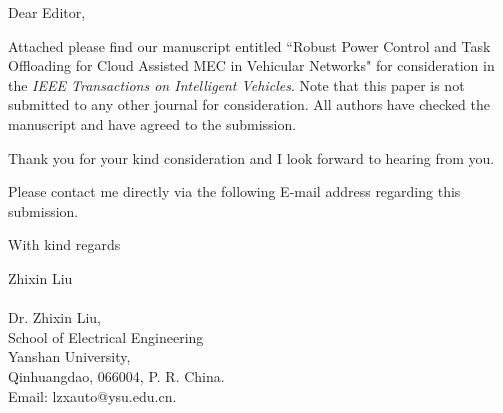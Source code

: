\documentclass[12pt]{letter}
\begin{document}
Dear Editor,

Attached please find our manuscript entitled ``Robust Power Control and Task Offloading for Cloud Assisted MEC in Vehicular Networks" for
consideration in the \emph{IEEE Transactions on Intelligent Vehicles}. Note that this paper
 is not submitted to any other journal for consideration. All
authors have checked the manuscript and have agreed to the
submission.

Thank you for your kind consideration and I look forward to hearing
from you.

Please contact me directly via the following E-mail address
regarding this submission.

With kind regards

Zhixin Liu\\
\\

Dr. Zhixin Liu,\\
School of Electrical Engineering\\
Yanshan University,\\
Qinhuangdao, 066004, P. R. China.\\
Email: lzxauto@ysu.edu.cn.
\end{document}
